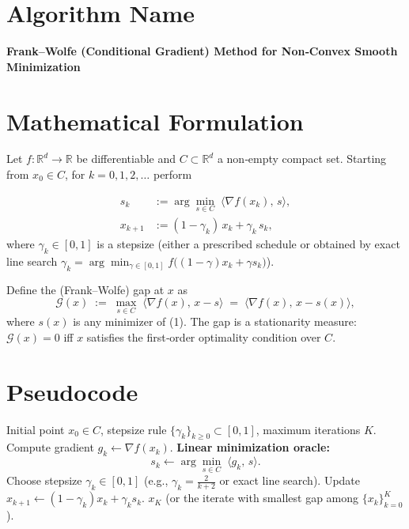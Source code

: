 \documentclass{article}
\newcommand{\gap}{\mathcal{G}}
\begin{document}
\section*{Algorithm Name}
\textbf{Frank–Wolfe (Conditional Gradient) Method for Non‑Convex Smooth Minimization}

\section*{Mathematical Formulation}
Let $f:\mathbb{R}^d\rightarrow\mathbb{R}$ be differentiable and $C\subset\mathbb{R}^d$ a non‑empty compact set.  
Starting from $x_0\in C$, for $k=0,1,2,\dots$ perform

\[
\begin{aligned}
s_k &:= \arg\min_{s\in C}\;\langle\nabla f(x_k),\,s\rangle , \tag{1}\\[4pt]
x_{k+1} &:= (1-\gamma_k)\,x_k + \gamma_k\,s_k , \tag{2}
\end{aligned}
\]
where $\gamma_k\in[0,1]$ is a stepsize (either a prescribed schedule or obtained by exact line search
$\gamma_k = \arg\min_{\gamma\in[0,1]} f\big((1-\gamma)x_k+\gamma s_k\big)$).

Define the (Frank–Wolfe) gap at $x$ as
\[
\gap(x) \;:=\; \max_{s\in C}\;\langle\nabla f(x),\,x-s\rangle
            \;=\; \langle\nabla f(x),\,x-s(x)\rangle ,
\]
where $s(x)$ is any minimizer of (1).  The gap is a stationarity measure: $\gap(x)=0$ iff $x$ satisfies the first‑order optimality condition over $C$.

\section*{Pseudocode}
\begin{algorithm}[H]
\caption{Frank–Wolfe for Non‑Convex $f$}
\begin{algorithmic}[1]
\REQUIRE Initial point $x_0\in C$, stepsize rule $\{\gamma_k\}_{k\ge 0}\subset[0,1]$, maximum iterations $K$.
    \STATE Compute gradient $g_k \gets \nabla f(x_k)$.
    \STATE \textbf{Linear minimization oracle:}
    \[
        s_k \gets \arg\min_{s\in C}\;\langle g_k,\,s\rangle .
    \]
    \STATE Choose stepsize $\gamma_k\in[0,1]$ (e.g., $\gamma_k=\frac{2}{k+2}$ or exact line search).
    \STATE Update $x_{k+1} \gets (1-\gamma_k)x_k + \gamma_k s_k$.
\ENDFOR
\RETURN $x_K$ (or the iterate with smallest gap among $\{x_k\}_{k=0}^K$).
\end{algorithmic}
\end{algorithm}
\end{document}
